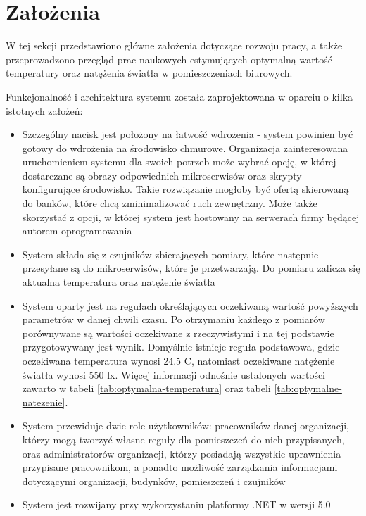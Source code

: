 \newpage
\section{Założenia}
W tej sekcji przedstawiono główne założenia dotyczące rozwoju pracy, a także
przeprowadzono przegląd prac naukowych estymujących optymalną wartość temperatury
oraz natężenia światła w pomieszczeniach biurowych.

Funkcjonalność i architektura systemu została zaprojektowana w oparciu o kilka istotnych 
założeń:

\begin{itemize}
    \item Szczególny nacisk jest położony na łatwość wdrożenia - system powinien być 
    gotowy do wdrożenia na środowisko 
    chmurowe. Organizacja zainteresowana uruchomieniem systemu dla swoich potrzeb 
    może wybrać opcję, w której dostarczane są obrazy odpowiednich mikroserwisów oraz 
    skrypty konfigurujące środowisko. Takie rozwiązanie mogłoby być ofertą skierowaną 
    do banków, które chcą zminimalizować ruch zewnętrzny. Może także skorzystać z 
    opcji, w której system jest hostowany na serwerach firmy będącej autorem 
    oprogramowania
    \item System składa się z czujników zbierających pomiary, które następnie przesyłane 
    są do mikroserwisów, które je przetwarzają. Do pomiaru zalicza się aktualna 
    temperatura oraz natężenie światła
    \item System oparty jest na regułach określających oczekiwaną wartość powyższych 
    parametrów w danej chwili czasu. Po otrzymaniu każdego z pomiarów porównywane są 
    wartości oczekiwane z rzeczywistymi i na tej podstawie przygotowywany jest wynik. 
    Domyślnie istnieje reguła podstawowa, gdzie oczekiwana temperatura wynosi 24.5
    \degree C, natomiast oczekiwane natężenie światła wynosi 550 lx. 
    Więcej informacji odnośnie ustalonych wartości zawarto 
    w tabeli \ref{tab:optymalna-temperatura} oraz tabeli \ref{tab:optymalne-natezenie}.
    \item System przewiduje dwie role użytkowników: pracowników danej 
    organizacji, którzy mogą tworzyć własne reguły dla pomieszczeń do nich 
    przypisanych, oraz administratorów organizacji, którzy posiadają wszystkie 
    uprawnienia przypisane pracownikom, a ponadto możliwość zarządzania informacjami 
    dotyczącymi organizacji, budynków, pomieszczeń i czujników
    \item System jest rozwijany przy wykorzystaniu platformy .NET w wersji 5.0
\end{itemize}

